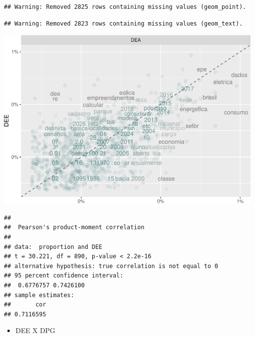 \documentclass[]{article}
\newenvironment{Shaded}{\begin{snugshade}}{\end{snugshade}}
\newcommand{\KeywordTok}[1]{\textcolor[rgb]{0.13,0.29,0.53}{\textbf{#1}}}
\newcommand{\DataTypeTok}[1]{\textcolor[rgb]{0.13,0.29,0.53}{#1}}
\newcommand{\StringTok}[1]{\textcolor[rgb]{0.31,0.60,0.02}{#1}}
\newcommand{\OperatorTok}[1]{\textcolor[rgb]{0.81,0.36,0.00}{\textbf{#1}}}
\newcommand{\NormalTok}[1]{#1}
\providecommand{\tightlist}{%
  \setlength{\itemsep}{0pt}\setlength{\parskip}{0pt}}
\begin{document}
\begin{verbatim}
## Warning: Removed 2825 rows containing missing values (geom_point).
\end{verbatim}

\begin{verbatim}
## Warning: Removed 2823 rows containing missing values (geom_text).
\end{verbatim}

\includegraphics{markdown_v31_files/figure-latex/unnamed-chunk-53-1.pdf}

\begin{Shaded}
\end{Shaded}

\begin{verbatim}
## 
##  Pearson's product-moment correlation
## 
## data:  proportion and DEE
## t = 30.221, df = 890, p-value < 2.2e-16
## alternative hypothesis: true correlation is not equal to 0
## 95 percent confidence interval:
##  0.6776757 0.7426100
## sample estimates:
##       cor 
## 0.7116595
\end{verbatim}

\begin{itemize}
\tightlist
\item
  DEE X DPG
\end{itemize}
\end{document}
